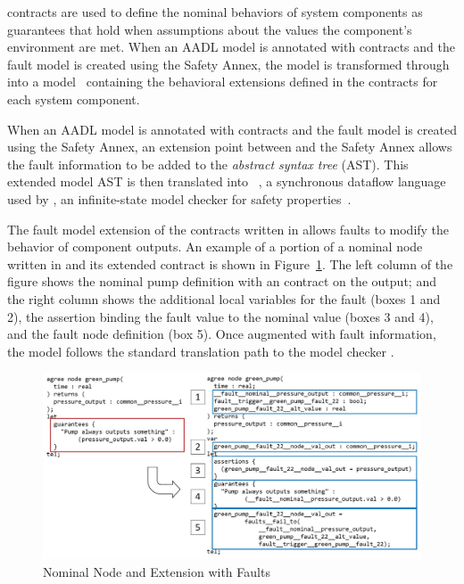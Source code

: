 \agree contracts are used to define the nominal behaviors of system components as guarantees that hold when assumptions about the values the component's environment are met. When an AADL model is annotated with \agree contracts and the fault model is created using the Safety Annex, the model is transformed through \agree into a \lustre model~\cite{Halbwachs91:IEEE} containing the behavioral extensions defined in the \agree contracts for each system component. 

When an AADL model is annotated with \agree contracts and the fault model is created using the Safety Annex, an extension point between \agree and the Safety Annex allows the fault information to be added to the \agree \textit{abstract syntax tree} (AST). This extended model AST is then translated into \lustre~\cite{Halbwachs91:IEEE}, a synchronous dataflow language used by \jkind, an infinite-state model checker for safety properties~\cite{2017arXiv171201222G}. 

The fault model extension of the contracts written in \agree allows faults to modify the behavior of component outputs. An example of a portion of a nominal \agree node written in \lustre and its extended contract is shown in Figure~\ref{fig:lustre}. The left column of the figure shows the nominal \lustre pump definition with an \agree contract on the output; and the right column shows the additional local variables for the fault (boxes 1 and 2), the assertion binding the fault value to the nominal value (boxes 3 and 4), and the fault node definition (box 5). Once augmented with fault information, the \agree model follows the standard translation path to the model checker \jkind. 

\begin{figure}[h!]
	\hspace*{-2cm}
	\begin{center}
		\includegraphics[scale=0.3]{images/lustre.jpg}
		\caption{Nominal \agree Node and Extension with Faults}
		\label{fig:lustre}
	\end{center}
\end{figure}


